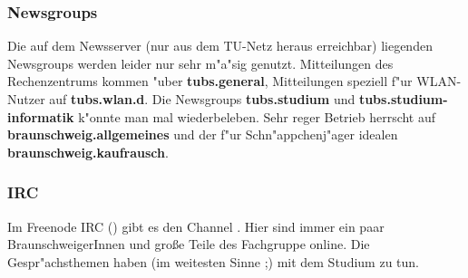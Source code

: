 \subsubsection*{Newsgroups}

Die auf dem Newsserver  (nur aus dem TU-Netz heraus
erreichbar) liegenden Newsgroups werden leider nur sehr m"a"sig genutzt.
Mitteilungen des Rechenzentrums kommen "uber \textbf{tubs.general},
Mitteilungen speziell f"ur WLAN-Nutzer auf \textbf{tubs.wlan.d}. Die Newsgroups
\textbf{tubs.studium} und \textbf{tubs.studium-informatik} k"onnte man mal
wiederbeleben. Sehr reger Betrieb herrscht auf
\textbf{braunschweig.allgemeines} und der f"ur Schn"appchenj"ager idealen
\textbf{braunschweig.kaufrausch}.

\subsubsection*{IRC}

Im Freenode IRC () gibt es den Channel . Hier
sind immer ein paar BraunschweigerInnen und große Teile des Fachgruppe online. Die Gespr"achsthemen haben (im weitesten
Sinne ;) mit dem Studium zu tun.

